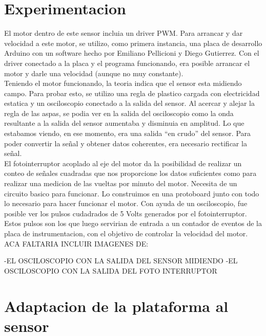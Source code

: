 
\section{Experimentacion} %
\label{sec:experimentacion}

El motor dentro de este sensor incluia un driver PWM. Para arrancar y dar velocidad a este motor, se utilizo, como primera instancia, una placa de desarrollo Arduino con un software hecho por Emiliano Pellicioni y Diego Gutierrez. Con el driver conectado a la placa y el programa funcionando, era posible arrancar el motor y darle una velocidad (aunque no muy constante). \\

Teniendo el motor funcionando, la teoria indica que el sensor esta midiendo campo. Para probar esto, se utilizo una regla de plastico cargada con electricidad estatica y un osciloscopio conectado a la salida del sensor. Al acercar y alejar la regla de las aspas, se podia ver en la salida del osciloscopio como la onda resultante a la salida del sensor aumentaba y disminuia en amplitud. Lo que estabamos viendo, en ese momento, era una salida ``en crudo'' del sensor. Para poder convertir la señal y obtener datos coherentes, era necesario rectificar la señal. \\

El fotointerruptor acoplado al eje del motor da la posibilidad de realizar un conteo de señales cuadradas que nos proporcione los datos suficientes como para realizar una medicion de las vueltas por minuto del motor. Necesita de un circuito basico para funcionar. Lo construimos en una protoboard junto con todo lo necesario para hacer funcionar el motor. Con ayuda de un osciloscopio, fue posible ver los pulsos cudadrados de 5 Volts generados por el fotointerruptor. Estos pulsos son los que luego servirian de entrada a un contador de eventos de la placa de instrumentacion, con el objetivo de controlar la velocidad del motor. \\

ACA FALTARIA INCLUIR IMAGENES DE:

-EL OSCILOSCOPIO CON LA SALIDA DEL SENSOR MIDIENDO
-EL OSCILOSCOPIO CON LA SALIDA DEL FOTO INTERRUPTOR


\section{Adaptacion de la plataforma al sensor} %
\label{sec:adaptacion_de_la_plataforma_al_sensor}

